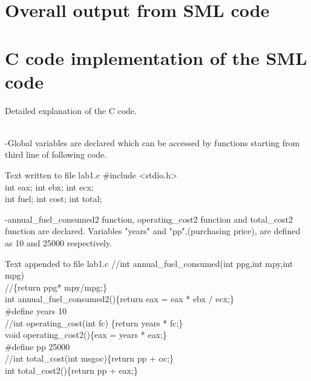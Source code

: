 \documentclass{article}
\begin{document}
\section*{Overall output from SML code}


\clearpage

\section*{C code implementation of the SML code}
\hypertarget{3}{Detailed explanation of the C code.} \\
-Global variables are declared which can be accessed by functions starting from third line of following code. 
\begin{GFT}{Text written to file lab1.c}
\+\#include <stdio.h>\\
\+int eax; int ebx; int ecx;\\
\+int fuel; int cost; int total;\\
\end{GFT}
\noindent{\color{red}\rule{\linewidth}{0.5mm}}
-annual_fuel_consumed2 function, operating_cost2 function and total_cost2 function are declared. Variables "years" and "pp",(purchasing price), are defined as 10 and 25000 respectively.
\begin{GFT}{Text appended to file lab1.c}
\+//int annual\_fuel\_consumed(int ppg,int mpy,int mpg)\\
\+//\{return ppg* mpy/mpg;\}\\
\+int annual\_fuel\_consumed2()\{return eax = eax * ebx / ecx;\}\\
\+\#define years 10\\
\+//int operating\_cost(int fc) \{return years * fc;\}\\
\+void operating\_cost2()\{eax = years * eax;\}\\
\+\#define pp 25000\\
\+//int total\_cost(int msgoc)\{return pp + oc;\}\\
\+int total\_cost2()\{return pp + eax;\}\\
\end{GFT}
\noindent{\color{red}\rule{\linewidth}{0.5mm}} \\
\clearpage
\end{document}
